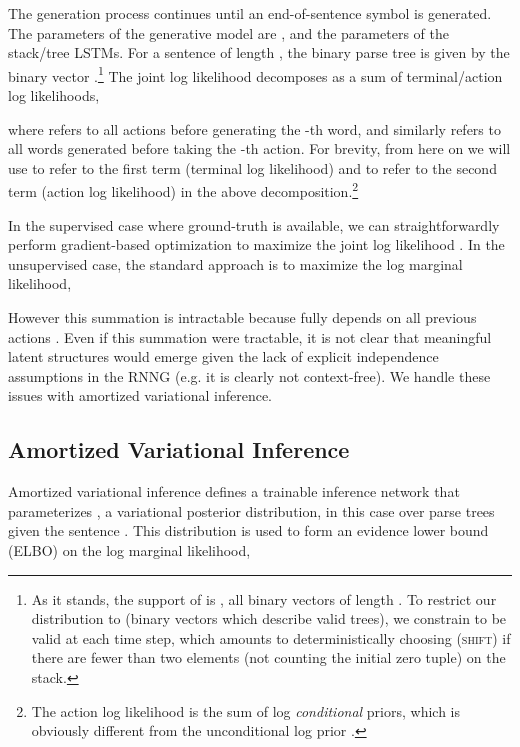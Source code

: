 \documentclass[11pt,a4paper]{article}
\begin{document}
\vspace{-2mm}
The generation process continues until an end-of-sentence symbol is generated.
The parameters  of the generative model are , and the parameters of the stack/tree LSTMs.
For a sentence  of length , the binary parse tree is given by the binary vector .\footnote{As it stands, the support of  is , all binary vectors of length . To restrict our distribution to  (binary vectors which describe valid trees), we constrain  to be valid at each time step, which amounts to deterministically choosing  (\textsc{shift}) if there are fewer than two elements (not counting the initial zero tuple) on the stack. }
The joint log likelihood decomposes as a sum of terminal/action log likelihoods,
        \vspace{-1mm}

where  refers to all actions before generating the -th word, and similarly  refers to all words generated before taking the -th action. For brevity, from here on we will use  to refer to the first term (terminal log likelihood) and  to
refer to the second term (action log likelihood) in the above decomposition.\footnote{The action log likelihood is the sum of log \emph{conditional} priors, which is obviously different from the unconditional log prior .}


In the supervised case where ground-truth  is available, we can straightforwardly perform gradient-based optimization to maximize the joint log likelihood . In the unsupervised case, the standard approach is to maximize the log marginal likelihood,
\vspace{-1mm}

However this summation is intractable because  fully depends on all previous actions . Even if this summation were tractable, it is not clear that
meaningful latent structures would emerge given the lack of explicit independence assumptions in the RNNG (e.g. it is clearly not context-free).
We handle these issues with amortized variational inference.

\vspace{-1mm}
\subsection{Amortized Variational Inference}
\vspace{-1mm}
Amortized variational inference  \cite{kingma2014vae} defines a trainable inference network  that parameterizes , a variational posterior distribution, in this case over parse trees  given the sentence . This distribution is used to form an  evidence lower bound (ELBO) on the log marginal likelihood,
\vspace{-1.5mm}
\end{document}
